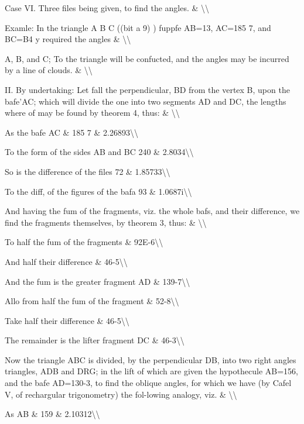 \documentclass{article}
\begin{document}
Case VI. Three files being given, to find the angles. \& \textbackslash{}\textbackslash{}

Examle: In the triangle A B C ((bit a 9) ) fuppfe AB=13, AC=185 7, and BC=B4 y required the angles \& \textbackslash{}\textbackslash{}

A, B, and C; To the triangle will be confucted, and the angles may be incurred by a line of clouds. \& \textbackslash{}\textbackslash{}

II. By undertaking: Let fall the perpendicular, BD from the vertex B, upon the bafe’AC; which will divide the one into two segments AD and DC, the lengths where of may be found by theorem 4, thus: \& \textbackslash{}\textbackslash{}

As the bafe AC \& 185 7 \& 2.26893\textbackslash{}\textbackslash{}

To the form of the sides AB and BC 240 \& 2.8034\textbackslash{}\textbackslash{}

So is the difference of the files 72 \& 1.85733\textbackslash{}\textbackslash{}

To the diff, of the figures of the bafa 93 \& 1.0687i\textbackslash{}\textbackslash{}

And having the fum of the fragments, viz. the whole bafs, and their difference, we find the fragments themselves, by theorem 3, thus: \& \textbackslash{}\textbackslash{}

To half the fum of the fragments \& 92E-6\textbackslash{}\textbackslash{}

And half their difference \& 46-5\textbackslash{}\textbackslash{}

And the fum is the greater fragment AD \& 139-7\textbackslash{}\textbackslash{}

Allo from half the fum of the fragment \& 52-8\textbackslash{}\textbackslash{}

Take half their difference \& 46-5\textbackslash{}\textbackslash{}

The remainder is the lifter fragment DC \& 46-3\textbackslash{}\textbackslash{}

Now the triangle ABC is divided, by the perpendicular DB, into two right angles triangles, ADB and DRG; in the lift of which are given the hypothecule AB=156, and the bafe AD=130-3, to find the oblique angles, for which we have (by Cafel V, of rechargular trigonometry) the fol-lowing analogy, viz. \& \textbackslash{}\textbackslash{}

As AB \& 159 \& 2.10312\textbackslash{}\textbackslash{}
\end{document}

